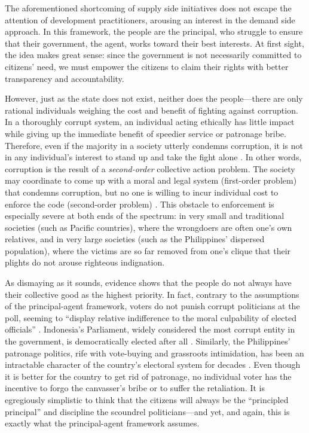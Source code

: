 \documentclass[12pt]{article}
\begin{document}
The aforementioned shortcoming of supply side initiatives does not escape the attention of development practitioners, arousing an interest in the demand side approach. In this framework, the people are the principal, who struggle to ensure that their government, the agent, works toward their best interests. At first sight, the idea makes great sense: since the government is not necessarily committed to citizens' need, we must empower the citizens to claim their rights with better transparency and accountability.

However, just as the state does not exist, neither does the people---there are only rational individuals weighing the cost and benefit of fighting against corruption. In a thoroughly corrupt system, an individual acting ethically has little impact while giving up the immediate benefit of speedier service or patronage bribe. Therefore, even if the majority in a society utterly condemns corruption, it is not in any individual's interest to stand up and take the fight alone \citep{Persson2010}. In other words, corruption is the result of a \textit{second-order} collective action problem. The society may coordinate to come up with a moral and legal system (first-order problem) that condemns corruption, but no one is willing to incur individual cost to enforce the code (second-order problem) \citep{Heckathorn1989}. This obstacle to enforcement is especially severe at both ends of the spectrum: in very small and traditional societies (such as Pacific countries), where the wrongdoers are often one's own relatives, and in very large societies (such as the Philippines' dispersed population), where the victims are so far removed from one's clique that their plights do not arouse righteous indignation.

As dismaying as it sounds, evidence shows that the people do not always have their collective good as the highest priority. In fact, contrary to the assumptions of the principal-agent framework, voters do not punish corrupt politicians at the poll, seeming to ``display relative indifference to the moral culpability of elected officials'' \citep{Chang2007}. Indonesia's Parliament, widely considered the most corrupt entity in the government, is democratically elected after all \citep{Integrity2012a}. Similarly, the Philippines' patronage politics, rife with vote-buying and grassroots intimidation, has been an intractable character of the country's electoral system for decades \citep{Sidel1999}. Even though it is better for the country to get rid of patronage, no individual voter has the incentive to forgo the canvasser's bribe or to suffer the retaliation. It is egregiously simplistic to think that the citizens will always be the ``principled principal'' and discipline the scoundrel politicians---and yet, and again, this is exactly what the principal-agent framework assumes.
\end{document}
